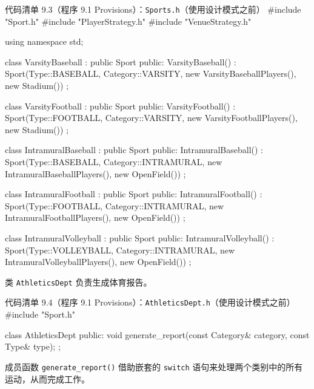 \begin{codeboxt}{代码清单 9.3（程序 9.1 Provisions）：\texttt{Sports.h}（使用设计模式之前）}
#include "Sport.h"
#include "PlayerStrategy.h"
#include "VenueStrategy.h"

using namespace std;

class VarsityBaseball : public Sport
{
public:
    VarsityBaseball() : Sport(Type::BASEBALL, Category::VARSITY,
                              new VarsityBaseballPlayers(),
                              new Stadium()) {}
};

class VarsityFootball : public Sport
{
public:
    VarsityFootball() : Sport(Type::FOOTBALL, Category::VARSITY,
                              new VarsityFootballPlayers(),
                              new Stadium()) {}
};

class IntramuralBaseball : public Sport
{
public:
    IntramuralBaseball() : Sport(Type::BASEBALL, 
                                 Category::INTRAMURAL,
                                 new IntramuralBaseballPlayers(),
                                 new OpenField()) {}
};

class IntramuralFootball : public Sport
{
public:
    IntramuralFootball() : Sport(Type::FOOTBALL, 
                                 Category::INTRAMURAL,
                                 new IntramuralFootballPlayers(),
                                 new OpenField()) {}
};

class IntramuralVolleyball : public Sport
{
public:
    IntramuralVolleyball() : Sport(Type::VOLLEYBALL, 
                                   Category::INTRAMURAL,
                                   new IntramuralVolleyballPlayers(),
                                   new OpenField()) {}
};
\end{codeboxt}

类 \texttt{Athletics\allowbreak{}Dept} 负责生成体育报告。

\begin{codeboxt}{代码清单 9.4（程序 9.1 Provisions）：\texttt{Athletics\allowbreak{}Dept.\allowbreak{}h}（使用设计模式之前）}
#include "Sport.h"

class AthleticsDept
{
public:
    void generate_report(const Category& category, const Type& type);
};
\end{codeboxt}

成员函数 \texttt{generate\_\allowbreak{}report(\allowbreak{})\allowbreak{}} 借助嵌套的 \texttt{switch} 语句来处理两个类别中的所有运动，从而完成工作。

